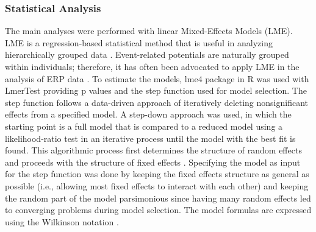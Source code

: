 \subsubsection{Statistical Analysis}
The main analyses were performed with linear Mixed-Effects Models (LME). LME is a regression-based statistical method that is useful in analyzing hierarchically grouped data \parencite{bickelMultilevelAnalysisApplied2007}.
Event-related potentials are naturally grouped within individuals; therefore, it has often been advocated to apply LME in the analysis of ERP data \parencite{volpert-esmondUsingMultilevelModels2021,vossenMorePotentialStatistical2011}. 
To estimate the models, lme4 package \parencite{batesFittingLinearMixedEffects2015} in R was used with LmerTest \parencite{kuznetsovaLmerTestPackageTests2017} providing p values and the step function used for model selection. The step function follows a data-driven approach of iteratively deleting nonsignificant effects from a specified model. A step-down approach was used, in which the starting point is a full model that is compared to a reduced model using a likelihood-ratio test in an iterative process until the model with the best fit is found. This algorithmic process first determines the structure of random effects and proceeds with the structure of fixed effects \parencite{kuznetsovaLmerTestPackageTests2017}. Specifying the model as input for the step function was done by keeping the fixed effects structure as general as possible (i.e., allowing most fixed effects to interact with each other) and keeping the random part of the model parsimonious since having many random effects led to converging problems during model selection. The model formulas are expressed using the Wilkinson notation \parencite{wilkinsonSymbolicDescriptionFactorial1973}.

